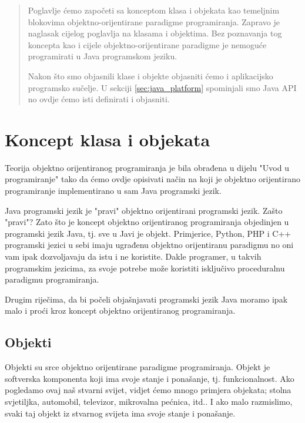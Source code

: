\label{chap:programming_language_concepts}
\begin{abstract}
    Poglavlje ćemo započeti sa konceptom klasa i objekata kao temeljnim blokovima objektno-orijentirane paradigme programiranja. Zapravo je naglasak cijelog poglavlja na klasama i objektima. Bez poznavanja tog koncepta kao i cijele objektno-orijentirane paradigme je nemoguće programirati u Java programskom jeziku.
    
    Nakon što smo objasnili klase i objekte objasniti ćemo i aplikacijsko programsko sučelje. U sekciji \ref{sec:java_platform} spominjali smo Java API no ovdje ćemo isti definirati i objasniti.
\end{abstract}

\section{Koncept klasa i objekata}
Teorija objektno orijentiranog programiranja je bila obrađena u dijelu "Uvod u programiranje" tako da ćemo ovdje opisivati način na koji je objektno orijentirano programiranje implementirano u sam Java programski jezik.

Java programski jezik je "pravi" objektno orijentirani programski jezik. Zašto "pravi"? Zato što je koncept objektno orijentiranog programiranja objedinjen u programski jezik Java, tj. sve u Javi je objekt. Primjerice, Python, PHP i C++ programski jezici u sebi imaju ugrađenu objektno orijentiranu paradigmu no oni vam ipak dozvoljavaju da istu i ne koristite. Dakle programer, u takvih programskim jezicima, za svoje potrebe može koristiti isključivo proceduralnu paradigmu programiranja.

Drugim riječima, da bi počeli objašnjavati programski jezik Java moramo ipak malo i proći kroz koncept objektno orijentiranog programiranja.

\subsection{Objekti}
Objekti su srce objektno orijentirane paradigme programiranja. Objekt je softverska komponenta koji ima svoje stanje i ponašanje, tj. funkcionalnost. Ako pogledamo ovaj naš stvarni svijet, vidjet ćemo mnogo primjera objekata; stolna svjetiljka, automobil, televizor, mikrovalna pećnica, itd.. I ako malo razmislimo, svaki taj objekt iz stvarnog svijeta ima svoje stanje i ponašanje.

